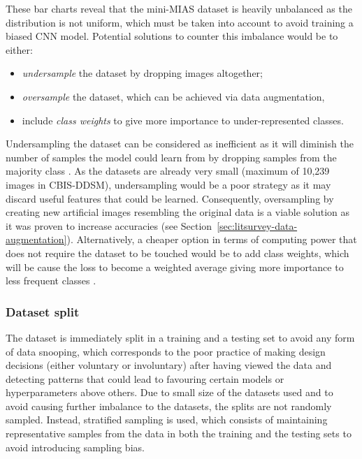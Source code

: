 These bar charts reveal that the mini-MIAS dataset is heavily unbalanced as the distribution is not uniform, which must be taken into account to avoid training a biased CNN model. Potential solutions to counter this imbalance would be to either:
\begin{itemize}
    \item \textit{undersample} the dataset by dropping images altogether;
    \item \textit{oversample} the dataset, which can be achieved via data augmentation,
    \item include \textit{class weights} to give more importance to under-represented classes. 
\end{itemize}

Undersampling the dataset can be considered as inefficient as it will diminish the number of samples the model could learn from by dropping samples from the majority class \citep{Liu2009}. As the datasets are already very small (maximum of 10,239 images in CBIS-DDSM), undersampling would be a poor strategy as it may discard useful features that could be learned. Consequently, oversampling by creating new artificial images resembling the original data is a viable solution as it was proven to increase accuracies (see Section~\ref{sec:litsurvey-data-augmentation}). Alternatively, a cheaper option in terms of computing power that does not require the dataset to be touched would be to add class weights, which will be cause the loss to become a weighted average giving more importance to less frequent classes \citep{Zhu2018}.

\subsubsection{Dataset split}

The dataset is immediately split in a training and a testing set to avoid any form of data snooping, which corresponds to the poor practice of making design decisions (either voluntary or involuntary) after having viewed the data and detecting patterns that could lead to favouring certain models or hyperparameters above others. Due to small size of the datasets used and to avoid causing further imbalance to the datasets, the splits are not randomly sampled. Instead, stratified sampling is used, which consists of maintaining representative samples from the data in both the training and the testing sets to avoid introducing sampling bias.\\

